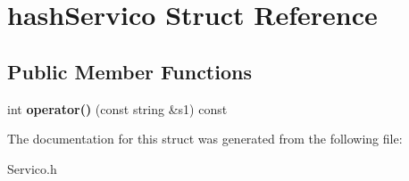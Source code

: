 \hypertarget{structhash_servico}{}\section{hash\+Servico Struct Reference}
\label{structhash_servico}
\subsection*{Public Member Functions}
\begin{DoxyCompactItemize}
\item 
int {\bfseries operator()} (const string \&s1) const \hypertarget{structhash_servico_a7365c888f866b5f37e65fd6e7123530c}{}\label{structhash_servico_a7365c888f866b5f37e65fd6e7123530c}

\end{DoxyCompactItemize}


The documentation for this struct was generated from the following file\+:\begin{DoxyCompactItemize}
\item 
Servico.\+h\end{DoxyCompactItemize}
